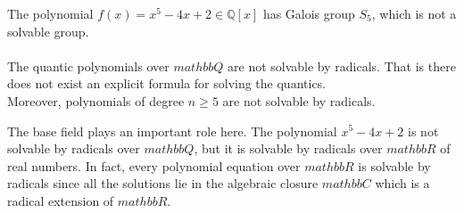 The polynomial \(f(x)=x^5-4x+2 \in \mathbb{Q}[x]\) has Galois group \(S_5\), which is not a solvable group. \\ \\
The quantic polynomials over \(mathbb{Q}\) are not solvable by radicals. That is there does not exist an explicit formula for solving the quantics. \\
Moreover, polynomials of degree \(n \geq 5\) are not solvable by radicals.

\begin{remark}
The base field plays an important role here. The polynomial \(x^5-4x+2\) is not solvable by radicals over \(mathbb{Q}\), but it is solvable by radicals over \(mathbb{R}\) of real numbers. In fact, every polynomial equation over \(mathbb{R}\) is solvable by radicals since all the solutions lie in the algebraic closure \(mathbb{C}\) which is a radical extension of \(mathbb{R}\).
\end{remark}

